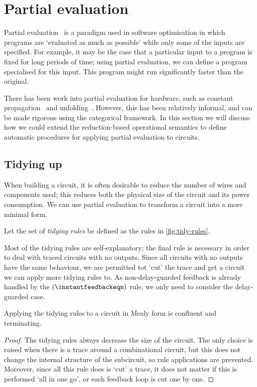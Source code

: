 \section{Partial evaluation}

Partial evaluation~\cite{jones1996introduction} is a paradigm used in software
optimisation in which programs are `evaluated as much as possible' while only
some of the inputs are specified.
For example, it may be the case that a particular input to a program is fixed
for long periods of time; using partial evaluation, we can define a program
specialised for this input.
This program might run significantly faster than the original.

There has been work into partial evaluation for hardware, such as constant
propagation~\cite{singh1996expressing,singh1999partial} and
unfolding~\cite{thompson2006bitlevel}.
However, this has been relatively informal, and can be made rigorous using the
categorical framework.
In this section we will discuss how we could extend the reduction-based
operational semantics to define automatic procedures for applying partial
evaluation to circuits.

\subsection{Tidying up}

When building a circuit, it is often desirable to reduce the number of wires
and components used; this reduces both the physical size of the circuit and its
power consumption.
We can use partial evaluation to transform a circuit into a more minimal form.

\begin{definition}
    Let the set of \emph{tidying rules} be defined as the rules in
    \cref{fig:tidy-rules}.
\end{definition}

Most of the tidying rules are self-explanatory; the final rule is necessary in
order to deal with traced circuits with no outputs.
Since all circuits with no outputs have the same behaviour, we are permitted tot
`cut' the trace and get a circuit we can apply more tidying rules to.
As non-delay-guarded feedback is already handled by the
\((\instantfeedbackeqn)\) rule, we only need to consider the delay-guarded case.



\begin{proposition}
    Applying the tidying rules to a circuit in Mealy form is confluent and
    terminating.
\end{proposition}
\begin{proof}
    The tidying rules always decrease the size of the circuit.
    The only choice is raised when there is a trace around a combinational
    circuit, but this does not change the internal structure of the subcircuit,
    so rule applications are prevented.
    Moreover, since all this rule does is `cut' a trace, it does not matter if
    this is performed `all in one go', or each feedback loop is cut one by one.
\end{proof}

